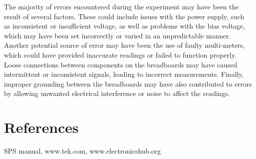 \documentclass[a4paper, amsfonts, amssymb, amsmath, reprint, showkeys, nofootinbib, twoside]{revtex4-1}
\begin{document}
The majority of errors encountered during the experiment may have been the result of several factors. These could include issues with the power supply, such as inconsistent or insufficient voltage, as well as problems with the bias voltage, which may have been set incorrectly or varied in an unpredictable manner. Another potential source of error may have been the use of faulty multi-meters, which could have provided inaccurate readings or failed to function properly. Loose connections between components on the breadboards may have caused intermittent or inconsistent signals, leading to incorrect measurements. Finally, improper grounding between the breadboards may have also contributed to errors by allowing unwanted electrical interference or noise to affect the readings.

\section{References}
SPS manual, www.tek.com, www.electronicshub.org
\end{document}
